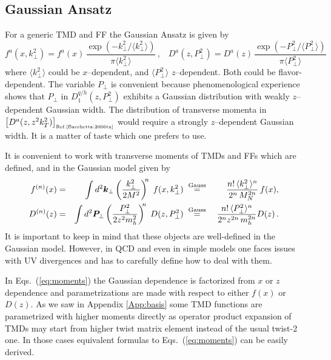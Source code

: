 \documentclass[a4paper,11pt]{article}
\newcommand{\be}{\begin{equation}}
\newcommand{\ee}{\end{equation}}
\newcommand{\la}{\langle}
\newcommand{\ra}{\rangle}
\def\bfkperp{{\bm k}_\perp}
\def\bfpperp{{\bm P}_\perp}
\def\kperp{k_\perp}
\def\pperp{P_\perp}
\begin{document}
\subsection{Gaussian Ansatz}

For a generic TMD and FF the Gaussian Ansatz is given by 
\be
    f^a(x,\kperp^2)=
    f^a(x)\,\frac{\exp(-\kperp^2/\la\kperp^2\ra)}{\pi\la\kperp^2\ra}\,,\;\;\;
    D^a(z,\pperp^2)=
    D^a(z)\,\frac{\exp(-\pperp^2/\la\pperp^2\ra)}{\pi\la\pperp^2\ra}
\ee
where 
$\la\kperp^2\ra$ could be $x$--dependent,  
and $\la\pperp^2\ra$ $z$--dependent. 
Both could be flavor-dependent.
The variable $\pperp$ is convenient because phenomenological experience 
shows that $\pperp$ in $D_1^{q/h}(z,\pperp^2)$ exhibits a Gaussian distribution 
with weakly $z$--dependent Gaussian width. The distribution of transverse 
momenta in $\left[D^a(z,z^2 k_T^2)\right]_{\mbox{\tiny Ref.\cite{Bacchetta:2006tn}}}$ 
would require a strongly $z$--dependent Gaussian width. It is a matter of 
taste which one prefers to use.

It is convenient to work with transverse moments of TMDs and FFs
which are defined, and in the Gaussian model given by
\begin{alignat}{6}
	f^{(n)}(x) &=& \int d^2\bfkperp
	\left(\frac{\kperp^2}{2M^2}\right)^{\!\!n}\; f(x, \kperp^2)
	\;&\stackrel{\rm Gauss}{=}&\;
	\frac{n!\,\la \kperp^2\ra^n}{ 2^n\,M_N^{2n}}\, f(x),\;\;\;\nonumber\\
	D^{(n)}(z) &=& \int d^2\bfpperp
	\left(\frac{\pperp^2}{2 z^2 m_h^2}\right)^{\!\!n}\; D(z, \pperp^2)
	\;&\stackrel{\rm Gauss}{=}&\;
	\frac{n!\,\la \pperp^2\ra^n}{ 2^n_{ }z^{2n}_{ }\,m_{h}^{2n}} D(z)\,. \;\;\;
	\label{eq:moments}
\end{alignat}
It is important to keep in mind that these objects are well-defined
in the Gaussian model. However, in QCD and even in simple models
\cite{Avakian:2010br,Schweitzer:2012hh} one faces issues with UV 
divergences and has to carefully define how to deal with them. 

In Eqs.~(\ref{eq:moments}) the Gaussian dependence is factorized 
from $x$ or $z$ dependence and parametrizations are made with 
respect to either $f(x)$ or $D(z)$. As we saw in Appendix 
\ref{App:basis} some TMD functions are parametrized with higher 
moments directly as operator product expansion of TMDs may start 
from higher twist matrix element instead of the usual twist-2 one. 
In those cases equivalent formulas to Eqs.~(\ref{eq:moments}) can 
be easily derived.
\end{document}
